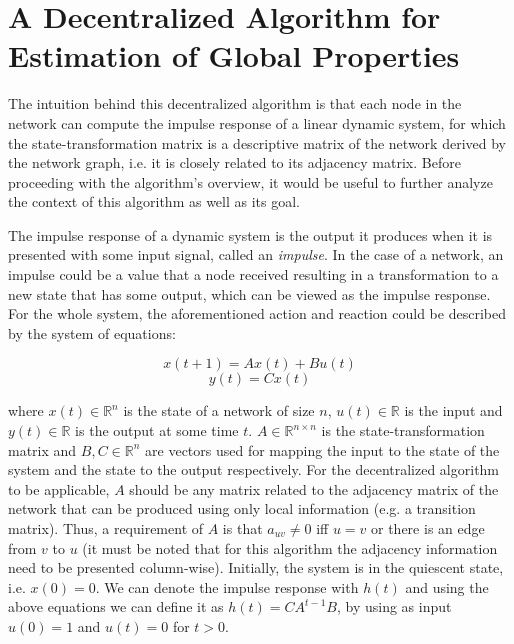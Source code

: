 \documentclass[MSc]{icldt}
\begin{document}
\section{A Decentralized Algorithm for Estimation of Global Properties}

The intuition behind this decentralized algorithm is that each node in the network can compute the impulse response of a linear dynamic system, for which the state-transformation matrix is a descriptive matrix of the network derived by the network graph, i.e. it is closely related to its adjacency matrix. Before proceeding with the algorithm's overview, it would be useful to further analyze the context of this algorithm as well as its goal.

The impulse response of a dynamic system is the output it produces when it is presented with some input signal, called an \textit{impulse}. In the case of a network, an impulse could be a value that a node received resulting in a transformation to a new state that has some output, which can be viewed as the impulse response. For the whole system, the aforementioned action and reaction could be described by the system of equations:

\begin{equation}
\label{eq:one}
x(t+1) = Ax(t)+Bu(t)
\end{equation}  
\begin{equation}
\label{eq:two}
y(t)=Cx(t)
\end{equation}  

where $x(t) \in \mathbb{R}^n$ is the state of a network of size $n$, $u(t) \in \mathbb{R}$ is the input and $y(t) \in \mathbb{R}$ is the output at some time $t$. $A \in \mathbb{R}^{n \times n} $ is the state-transformation matrix and $B, C \in \mathbb{R}^n$ are vectors used for mapping the input to the state of the system and the state to the output respectively. For the decentralized algorithm to be applicable, $A$ should be any matrix related to the adjacency matrix of the network that can be produced using only local information (e.g. a transition matrix). Thus, a requirement of $A$ is that $a_{uv} \neq 0$ iff $u=v$ or there is an edge from $v$ to $u$ (it must be noted that for this algorithm the adjacency information need to be presented column-wise). Initially, the system is in the quiescent state, i.e. $x(0)=0$. We can denote the impulse response with $h(t)$ and using the above equations we can define it as $h(t)=CA^{t-1}B$, by using as input $u(0)=1$ and $u(t)=0$ for $t > 0$.
\end{document}

